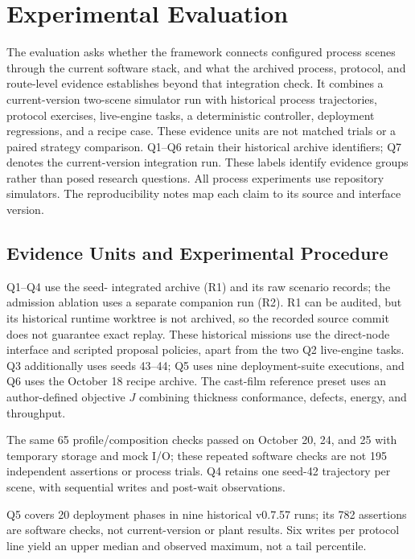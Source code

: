 \section{Experimental Evaluation}
\label{sec:eval}
The evaluation asks whether the framework connects configured process scenes
through the current software stack, and what the archived process, protocol,
and route-level evidence establishes beyond that integration check. It combines
a current-version two-scene simulator run with historical process trajectories,
protocol exercises, live-engine tasks, a deterministic controller,
deployment regressions, and a recipe case. These evidence units are not
matched trials or a paired strategy comparison. Q1--Q6 retain their historical
archive identifiers; Q7 denotes the current-version integration run. These
labels identify evidence groups rather than posed research questions. All
process experiments use repository simulators. The reproducibility notes map
each claim to its source and interface version.

\subsection{Evidence Units and Experimental Procedure}
\label{sec:testbed}
\label{sec:procedure}
Q1--Q4 use the seed-\resSeed{} integrated archive (R1) and its raw scenario
records; the admission ablation uses a separate companion run (R2). R1 can
be audited, but its historical runtime worktree is not archived, so the
recorded source commit does not guarantee exact replay. These historical
missions use the direct-node interface and scripted proposal policies,
apart from the two Q2 live-engine tasks. Q3 additionally uses seeds 43--44;
Q5 uses nine deployment-suite executions, and Q6 uses the October 18 recipe
archive. The cast-film reference preset uses an author-defined objective $J$
combining thickness conformance, defects, energy, and throughput.

The same 65 profile/composition checks passed on October 20, 24, and 25 with
temporary storage and mock I/O; these repeated software checks are not 195
independent assertions or process trials. Q4 retains one seed-42 trajectory
per scene, with sequential writes and post-wait observations.

Q5 covers 20 deployment phases in nine historical v0.7.57 runs; its 782
assertions are software checks, not current-version or plant results. Six
writes per protocol line yield an upper median and observed maximum, not a
tail percentile.

